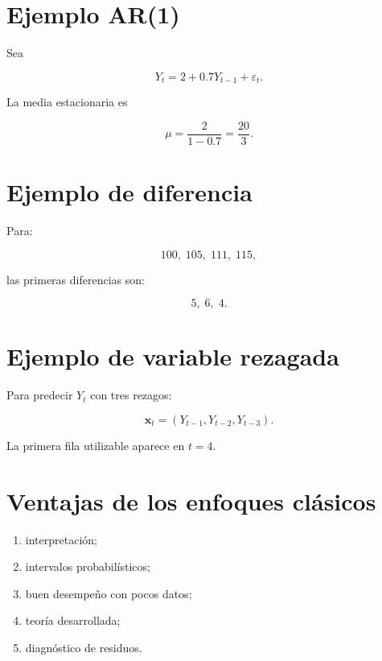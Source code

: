 \documentclass[
  spanish,
  10.5pt,
  letterpaper,
  DIV=11,
  numbers=noendperiod,
  oneside,
  open=any]{scrreprt}
\providecommand{\tightlist}{%
  \setlength{\itemsep}{0pt}\setlength{\parskip}{0pt}}
\theoremstyle{definition}
\theoremstyle{definition}
\theoremstyle{plain}
\theoremstyle{remark}
\begin{document}
\section*{Ejemplo AR(1)}\label{ejemplo-ar1}


Sea

\[
Y_t=2+0.7Y_{t-1}+\varepsilon_t.
\]

La media estacionaria es

\[
\mu=\frac{2}{1-0.7}
=
\frac{20}{3}.
\]

\section*{Ejemplo de diferencia}\label{ejemplo-de-diferencia}


Para:

\[
100,\;105,\;111,\;115,
\]

las primeras diferencias son:

\[
5,\;6,\;4.
\]

\section*{Ejemplo de variable
rezagada}\label{ejemplo-de-variable-rezagada}


Para predecir \(Y_t\) con tres rezagos:

\[
\mathbf{x}_t
=
(Y_{t-1},Y_{t-2},Y_{t-3}).
\]

La primera fila utilizable aparece en \(t=4\).

\section*{Ventajas de los enfoques
clásicos}\label{ventajas-de-los-enfoques-cluxe1sicos}


\begin{enumerate}
\def\labelenumi{\arabic{enumi}.}
\tightlist
\item
  interpretación;
\item
  intervalos probabilísticos;
\item
  buen desempeño con pocos datos;
\item
  teoría desarrollada;
\item
  diagnóstico de residuos.
\end{enumerate}
\end{document}
